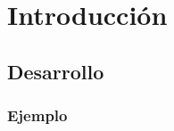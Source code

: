 \section{Introducción}
\lipsum[2-4]
\subsection{Desarrollo}
\lipsum[2-4]
\subsubsection{Ejemplo}
\lipsum[2-4]
